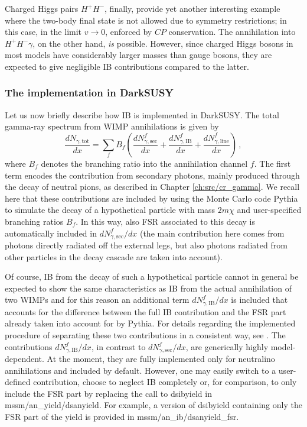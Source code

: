 \documentclass[a4paper,10pt,oneside]{book}
\newcommand{\code}[1]{\ft{#1}}
\newcommand{\ds}{{\sffamily DarkSUSY}}
\newcommand{\ft}[1]{\textsf{#1}}
\begin{document}
Charged Higgs pairs $H^+H^-$, finally, provide yet another interesting example 
where the two-body final state is not allowed due to symmetry restrictions; in this 
case, in the limit $v\rightarrow0$, enforced by  $CP$ conservation. The 
annihilation into $H^+H^-\gamma$, on the other hand, \emph{is} possible. However, 
since charged Higgs bosons in most models have considerably larger masses than 
gauge bosons, they are expected to give negligible IB contributions compared to the 
latter.

\subsubsection{The implementation in \ds}

Let us now briefly describe how  IB is implemented in \ds. The total gamma-ray 
spectrum  from WIMP annihilations is given by
\begin{equation}
  \frac{dN_{\gamma,\mathrm{tot}}}{dx}=\sum_f 
B_f\left(\frac{dN^f_{\gamma,\mathrm{sec}}}{dx}+\frac{dN^f_{\gamma,\mathrm{IB}}}{dx} 
+ \frac{dN^f_{\gamma,\mathrm{line}}}{dx}\right)\,,
\end{equation}
where $B_f$ denotes the branching ratio into the annihilation channel $f$. The 
first term encodes the contribution from secondary photons, mainly produced through 
the decay of neutral pions, as described in Chapter \ref{ch:src/cr_gamma}.
 We recall here that these contributions are included by using the Monte Carlo code 
{\sf Pythia} \cite{Sjostrand:2006za} to simulate the decay of a hypothetical particle with 
mass 
$2m\chi$ and user-specified branching ratios $B_f$.  In this way, also FSR 
associated to this decay  is automatically included in 
${dN^f_{\gamma,\mathrm{sec}}}/{dx}$ (the main contribution here comes from photons 
directly radiated off the external legs, but also photons radiated from other 
particles in the decay cascade are taken into account). 

Of course, IB from the decay of such a hypothetical particle cannot in general be 
expected  to show the same characteristics as IB from the actual annihilation of 
two WIMPs and for this reason an additional term ${dN^f_{\gamma,\mathrm{IB}}}/{dx}$ 
is included that accounts for the difference between the full IB contribution and 
the FSR part already taken into account for by {\sf Pythia}. For details regarding 
the 
implemented procedure of separating these two contributions in a consistent way, 
see \cite{Bringmann:2007nk}.
The contributions ${dN^f_{\gamma,\mathrm{IB}}}/{dx}$, in contrast to 
${dN^f_{\gamma,\mathrm{sec}}}/{dx}$, are generically highly model-dependent. At the 
moment, they are fully implemented only for neutralino annihilations and included 
by default. However, one may easily switch to a user-defined contribution, choose 
to neglect IB completely or, for comparison, to only include the FSR part 
by replacing the call to \code{dsibyield} in \code{mssm/an\_yield/dsanyield}.
For example, a version of \code{dsibyield}  containing only the FSR part
of the yield is provided in \code{mssm/an\_ib/dsanyield\_fsr}.
\end{document}
